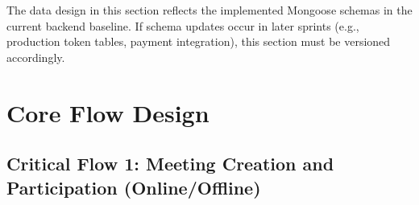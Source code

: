 \documentclass[12pt,a4paper]{article}
\begin{document}
\begin{tcolorbox}[significancestyle]
The data design in this section reflects the implemented Mongoose schemas in the current backend baseline.
If schema updates occur in later sprints (e.g., production token tables, payment integration), this section must be versioned accordingly.
\end{tcolorbox}

\section{Core Flow Design}

\subsection{Critical Flow 1: Meeting Creation and Participation (Online/Offline)}
\end{document}

